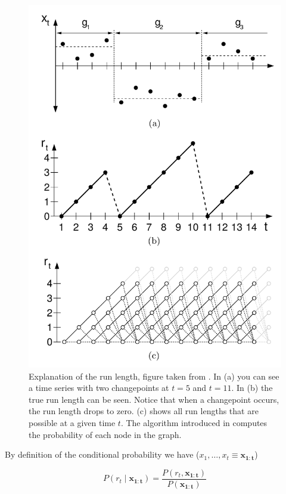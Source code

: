 \documentclass[12pt,a4paper]{article}
\begin{document}
\begin{figure}
	\centering
	\includegraphics{images/runlength_example.png}
	\caption{Explanation of the run length, figure taken from \cite{Adams:BayesianOnlineChangepoint}. In (a) you can see a time series with two changepoints at $t=5$ and $t=11$. In (b) the true run length can be seen. Notice that when a changepoint occurs, the run length drops to zero. (c) shows all run lengths that are possible at a given time $t$. The algorithm introduced in \cite{Adams:BayesianOnlineChangepoint} computes the probability of each node in the graph.}
	\label{fig:runlength_example}
\end{figure}

By definition of the conditional probability we have ($x_1,\dots,x_t \equiv \bm{{ x_{1:t}}}$)

\begin{equation*}
	P(r_t \mid \bm{{x_{1:t}}}) = \frac{P(r_t, \bm{{ x_{1:t}}})}{P(\bm{{x_{1:t}}})}
\end{equation*}
\end{document}
